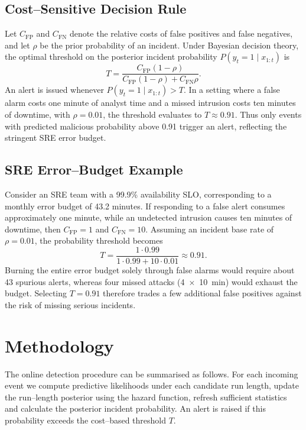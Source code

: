 \documentclass{article}
\begin{document}
\subsection{Cost--Sensitive Decision Rule}
Let \(C_{\mathrm{FP}}\) and \(C_{\mathrm{FN}}\) denote the relative costs of false positives and false negatives, and let \(\rho\) be the prior probability of an incident.  Under Bayesian decision theory, the optimal threshold on the posterior incident probability \(P(y_t=1\mid x_{1:t})\) is
\begin{equation}
  T = \frac{C_{\mathrm{FP}}(1-\rho)}{C_{\mathrm{FP}}(1-\rho) + C_{\mathrm{FN}} \rho}.
\end{equation}
An alert is issued whenever \(P(y_t=1\mid x_{1:t}) > T\).  In a setting where a false alarm costs one minute of analyst time and a missed intrusion costs ten minutes of downtime, with \(\rho=0.01\), the threshold evaluates to \(T\approx0.91\).  Thus only events with predicted malicious probability above 0.91 trigger an alert, reflecting the stringent SRE error budget.

\subsection{SRE Error--Budget Example}
Consider an SRE team with a 99.9\% availability SLO, corresponding to a monthly error budget of 43.2 minutes.  If responding to a false alert consumes approximately one minute, while an undetected intrusion causes ten minutes of downtime, then \(C_{\mathrm{FP}}=1\) and \(C_{\mathrm{FN}}=10\).  Assuming an incident base rate of \(\rho=0.01\), the probability threshold becomes
\[
  T = \frac{1\cdot0.99}{1\cdot0.99 + 10\cdot0.01} \approx 0.91.
\]
Burning the entire error budget solely through false alarms would require about 43 spurious alerts, whereas four missed attacks (4~\(\times\)~10~min) would exhaust the budget.  Selecting \(T=0.91\) therefore trades a few additional false positives against the risk of missing serious incidents.

\section{Methodology}
The online detection procedure can be summarised as follows.  For each incoming event we compute predictive likelihoods under each candidate run length, update the run--length posterior using the hazard function, refresh sufficient statistics and calculate the posterior incident probability.  An alert is raised if this probability exceeds the cost--based threshold $T$.
\end{document}
